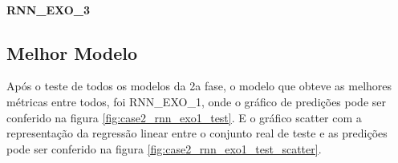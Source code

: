 \documentclass[	12pt, Times, openright, twoside, a4paper, english, brazil]{abntex2}
\begin{document}
            \paragraph{RNN\_EXO\_3}
            {\begin{center} \begin{minipage}[c]{1.0\textwidth}
            \begin{figure}[H]
            \end{figure}
            \end{minipage} \hfill %
              \begin{minipage}[c]{0.45\textwidth}
            \begin{figure}[H]
                \end{figure}
                \end{minipage} \end{center} } 
    	  \subsection{Melhor Modelo}
    	    Após o teste de todos os modelos da 2a fase, o modelo que obteve as melhores métricas entre todos, foi RNN\_EXO\_1, onde o gráfico de predições pode ser conferido na figura \ref{fig:case2_rnn_exo1_test}. E o gráfico scatter com a representação da regressão linear entre o conjunto real de teste e as predições pode ser conferido na figura \ref{fig:case2_rnn_exo1_test_scatter}.
    	    
\end{document}
